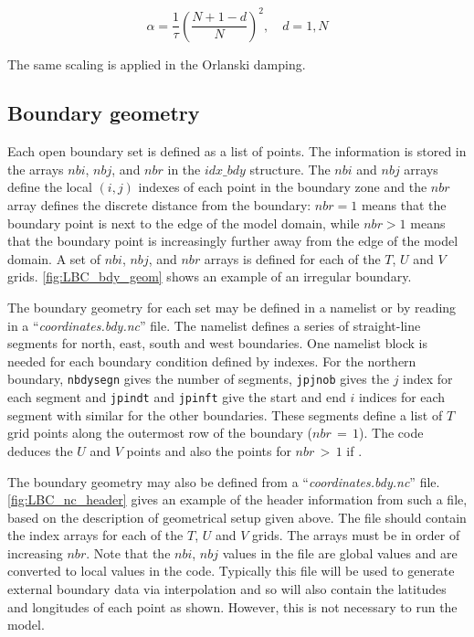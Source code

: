 \documentclass[../main/NEMO_manual]{subfiles}
\begin{document}
\[
  \alpha = \frac{1}{\tau}(\frac{N+1-d}{N})^2,       \quad d=1,N
\]

The same scaling is applied in the Orlanski damping.

\subsection{Boundary geometry}
\label{subsec:LBC_bdy_geometry}

Each open boundary set is defined as a list of points.
The information is stored in the arrays $nbi$, $nbj$, and $nbr$ in the $idx\_bdy$ structure.
The $nbi$ and $nbj$ arrays define the local $(i,j)$ indexes of each point in the boundary zone and
the $nbr$ array defines the discrete distance from the boundary: $nbr=1$ means that
the boundary point is next to the edge of the model domain, while $nbr>1$ means that
the boundary point is increasingly further away from the edge of the model domain.
A set of $nbi$, $nbj$, and $nbr$ arrays is defined for each of the $T$, $U$ and $V$ grids.
\autoref{fig:LBC_bdy_geom} shows an example of an irregular boundary.

The boundary geometry for each set may be defined in a namelist  or
by reading in a ``\textit{coordinates.bdy.nc}'' file.
The  namelist defines a series of straight-line segments for north, east, south and west boundaries.
One  namelist block is needed for each boundary condition defined by indexes.
For the northern boundary, \texttt{nbdysegn} gives the number of segments,
\texttt{jpjnob} gives the $j$ index for each segment and \texttt{jpindt} and
\texttt{jpinft} give the start and end $i$ indices for each segment with similar for the other boundaries.
These segments define a list of $T$ grid points along the outermost row of the boundary ($nbr\,=\, 1$).
The code deduces the $U$ and $V$ points and also the points for $nbr\,>\, 1$ if .

The boundary geometry may also be defined from a ``\textit{coordinates.bdy.nc}'' file.
\autoref{fig:LBC_nc_header} gives an example of the header information from such a file, based on the description of geometrical setup given above.
The file should contain the index arrays for each of the $T$, $U$ and $V$ grids.
The arrays must be in order of increasing $nbr$.
Note that the $nbi$, $nbj$ values in the file are global values and are converted to local values in the code.
Typically this file will be used to generate external boundary data via interpolation and so
will also contain the latitudes and longitudes of each point as shown.
However, this is not necessary to run the model.
\end{document}
